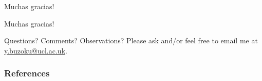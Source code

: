 \documentclass{beamer}
\begin{document}
	
\begin{frame}{Muchas gracias!}
\begin{center}
Muchas gracias!

Questions? Comments? Observations? Please ask and/or feel free to email me at \url{y.buzoku@ucl.ac.uk}.
\end{center}
\end{frame}
\begin{frame}[allowframebreaks]
	\frametitle{References}
	\nocite{*}
	
	
\end{frame}
\end{document}
